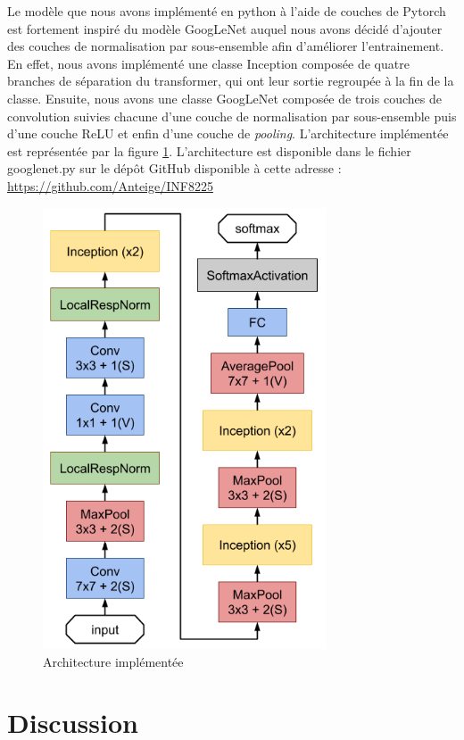 \documentclass{article}
\begin{document}
Le modèle que nous avons implémenté en python à l’aide de couches de Pytorch
est fortement inspiré du modèle GoogLeNet auquel nous avons décidé d’ajouter des
couches de normalisation par sous-ensemble afin d’améliorer l’entrainement. En
effet, nous avons implémenté une classe Inception composée de quatre branches de
séparation du transformer, qui ont leur sortie regroupée à la fin de la classe.
Ensuite, nous avons une classe GoogLeNet composée de trois couches de
convolution suivies chacune d'une couche de normalisation par sous-ensemble puis
d’une couche ReLU et enfin d’une couche de \textit{pooling}. L'architecture
implémentée est représentée par la figure \ref{8}. L'architecture est disponible
dans le fichier googlenet.py sur le dépôt GitHub disponible à cette adresse :
\url{https://github.com/Anteige/INF8225}

\begin{figure}[htbp]
    \includegraphics[width=8.4cm]{./figures/Figure7bis.png} 
    \caption{Architecture implémentée}
    \label{8} 
\end{figure} 

\section{Discussion}
\end{document}
